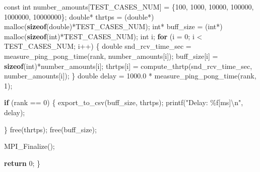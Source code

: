 \documentclass[11pt]{article}
\newenvironment{Shaded}{}{}
\newcommand{\KeywordTok}[1]{\textcolor[rgb]{0.00,0.44,0.13}{\textbf{{#1}}}}
\newcommand{\DataTypeTok}[1]{\textcolor[rgb]{0.56,0.13,0.00}{{#1}}}
\newcommand{\DecValTok}[1]{\textcolor[rgb]{0.25,0.63,0.44}{{#1}}}
\newcommand{\FloatTok}[1]{\textcolor[rgb]{0.25,0.63,0.44}{{#1}}}
\newcommand{\StringTok}[1]{\textcolor[rgb]{0.25,0.44,0.63}{{#1}}}
\newcommand{\NormalTok}[1]{{#1}}
\newcommand{\SpecialCharTok}[1]{\textcolor[rgb]{0.25,0.44,0.63}{{#1}}}
\newcommand{\ControlFlowTok}[1]{\textcolor[rgb]{0.00,0.44,0.13}{\textbf{{#1}}}}
\newcommand{\OperatorTok}[1]{\textcolor[rgb]{0.40,0.40,0.40}{{#1}}}
\begin{document}
\begin{Shaded}
\begin{Highlighting}[]
  \DataTypeTok{const} \DataTypeTok{int}\NormalTok{ number\_amounts}\OperatorTok{[}\NormalTok{TEST\_CASES\_NUM}\OperatorTok{]} \OperatorTok{=} \OperatorTok{\{}\DecValTok{100}\OperatorTok{,} \DecValTok{1000}\OperatorTok{,} \DecValTok{10000}\OperatorTok{,} \DecValTok{100000}\OperatorTok{,}  \DecValTok{1000000}\OperatorTok{,} \DecValTok{10000000}\OperatorTok{\};}
  \DataTypeTok{double}\OperatorTok{*}\NormalTok{ thrtps }\OperatorTok{=} \OperatorTok{(}\DataTypeTok{double}\OperatorTok{*)}\NormalTok{ malloc}\OperatorTok{(}\KeywordTok{sizeof}\OperatorTok{(}\DataTypeTok{double}\OperatorTok{)*}\NormalTok{TEST\_CASES\_NUM}\OperatorTok{);}
  \DataTypeTok{int}\OperatorTok{*}\NormalTok{ buff\_size }\OperatorTok{=} \OperatorTok{(}\DataTypeTok{int}\OperatorTok{*)}\NormalTok{ malloc}\OperatorTok{(}\KeywordTok{sizeof}\OperatorTok{(}\DataTypeTok{int}\OperatorTok{)*}\NormalTok{TEST\_CASES\_NUM}\OperatorTok{);}
  \DataTypeTok{int}\NormalTok{ i}\OperatorTok{;}  
  \ControlFlowTok{for} \OperatorTok{(}\NormalTok{i }\OperatorTok{=} \DecValTok{0}\OperatorTok{;}\NormalTok{ i }\OperatorTok{\textless{}}\NormalTok{ TEST\_CASES\_NUM}\OperatorTok{;}\NormalTok{ i}\OperatorTok{++)} \OperatorTok{\{}
    \DataTypeTok{double}\NormalTok{ snd\_rcv\_time\_sec }\OperatorTok{=}\NormalTok{ measure\_ping\_pong\_time}\OperatorTok{(}\NormalTok{rank}\OperatorTok{,}\NormalTok{ number\_amounts}\OperatorTok{[}\NormalTok{i}\OperatorTok{]);}
\NormalTok{    buff\_size}\OperatorTok{[}\NormalTok{i}\OperatorTok{]} \OperatorTok{=} \KeywordTok{sizeof}\OperatorTok{(}\DataTypeTok{int}\OperatorTok{)*}\NormalTok{number\_amounts}\OperatorTok{[}\NormalTok{i}\OperatorTok{];}
\NormalTok{        thrtps}\OperatorTok{[}\NormalTok{i}\OperatorTok{]} \OperatorTok{=}\NormalTok{ compute\_thrtp}\OperatorTok{(}\NormalTok{snd\_rcv\_time\_sec}\OperatorTok{,}\NormalTok{ number\_amounts}\OperatorTok{[}\NormalTok{i}\OperatorTok{]);} 
  \OperatorTok{\}} 
  \DataTypeTok{double}\NormalTok{ delay }\OperatorTok{=} \FloatTok{1000.0} \OperatorTok{*}\NormalTok{ measure\_ping\_pong\_time}\OperatorTok{(}\NormalTok{rank}\OperatorTok{,} \DecValTok{1}\OperatorTok{);}  

  \ControlFlowTok{if} \OperatorTok{(}\NormalTok{rank }\OperatorTok{==} \DecValTok{0}\OperatorTok{)} \OperatorTok{\{}
\NormalTok{    export\_to\_csv}\OperatorTok{(}\NormalTok{buff\_size}\OperatorTok{,}\NormalTok{ thrtps}\OperatorTok{);}
\NormalTok{        printf}\OperatorTok{(}\StringTok{"Delay: \%f[ms]}\SpecialCharTok{\textbackslash{}n}\StringTok{"}\OperatorTok{,}\NormalTok{ delay}\OperatorTok{);}
    
  \OperatorTok{\}}
\NormalTok{  free}\OperatorTok{(}\NormalTok{thrtps}\OperatorTok{);}
\NormalTok{  free}\OperatorTok{(}\NormalTok{buff\_size}\OperatorTok{);}

\NormalTok{  MPI\_Finalize}\OperatorTok{();}

  \ControlFlowTok{return} \DecValTok{0}\OperatorTok{;}
\OperatorTok{\}}
\end{Highlighting}
\end{Shaded}
\end{document}
